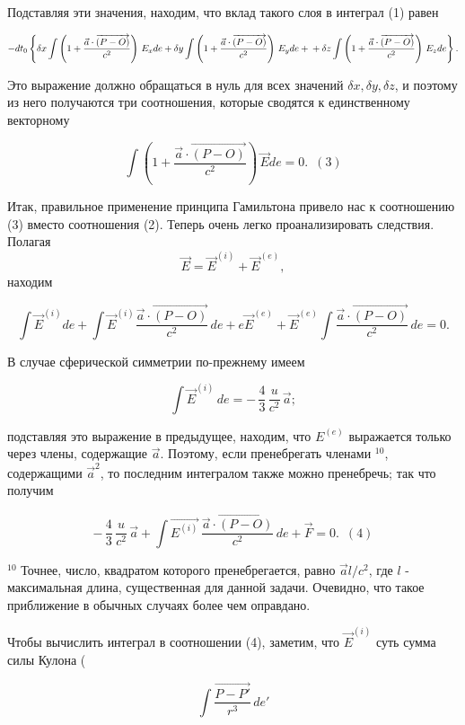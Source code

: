 \documentclass[11pt]{article}
\begin{document}
    Подставляя эти значения, находим, что вклад такого слоя в интеграл (1)
равен

\[ - dt_0\left\{
\delta x \int \left (1 + \frac{\vec {a} \cdot \overrightarrow{\left(P - O\right)}}{c^2}\right)\, E_x de
+
\delta y \int \left (1 + \frac{\vec {a} \cdot \overrightarrow{\left(P - O\right)}}{c^2}\right)\, E_y de
+ \\ +
\delta z \int \left (1 + \frac{\vec {a} \cdot \overrightarrow{\left(P - O\right)}}{c^2}\right)\, E_z de
\right\}.\]

Это выражение должно обращаться в нуль для всех значений
\(\delta x, \delta y, \delta z\), и поэтому из него получаются три
соотношения, которые сводятся к единственному векторному

\[\int \left (1 + \frac{\vec {a} \cdot \overrightarrow{\left(P - O\right)}}{c^2}\right)\, \vec E de = 0.\,\,\,(3)\]

    Итак, правильное применение принципа Гамильтона привело нас к
соотношению (3) вместо соотношения (2). Теперь очень легко
проанализировать следствия. Полагая
\[\vec {E} = {\vec {E}}^{(i)} + {\vec {E}}^{(e)},\] находим

\[
\int \vec E^{(i)} de +
\int \vec E^{(i)} \frac{\vec {a} \cdot \overrightarrow{\left(P - O\right)}}{c^2} \, de +
e \vec E^{(e)} +
\vec E^{(e)} \int \frac{\vec {a} \cdot \overrightarrow{\left(P - O\right)}}{c^2} \, de
= 0.\]

    В случае сферической симметрии по-прежнему имеем

\[\int \vec {E}^{(i)} \, de = - \, \frac{4}{3} \, \frac{u}{c^2} \, \vec {a};\]

подставляя это выражение в предыдущее, находим, что \(E^{(e)}\) выражается
только через члены, содержащие \(\vec {a}\). Поэтому, если пренебрегать
членами \(^{10}\), содержащими \({\vec {a}}^2\), то последним интегралом
также можно пренебречь; так что получим

\[- \,\frac{4}{3} \,\frac{u}{c^2} \,\vec {a} +
\int \vec {E^{(i)}} \, \frac{\vec {a} \cdot \overrightarrow{\left(P - O\right)}}{c^2} \, de +
\vec {F} = 0. \,\,\, (4)\]

    \(^{10}\) Точнее, число, квадратом которого пренебрегается, равно
\(\vec {a} l/c^2\), где \(l\) - максимальная длина, существенная для
данной задачи. Очевидно, что такое приближение в обычных случаях более
чем оправдано.

    Чтобы вычислить интеграл в соотношении (4), заметим, что ${\vec {E}}^{(i)}$ суть сумма силы Кулона (

\[\int\frac{\overrightarrow{P-P'}}{r^3}\,de'\]
\end{document}
